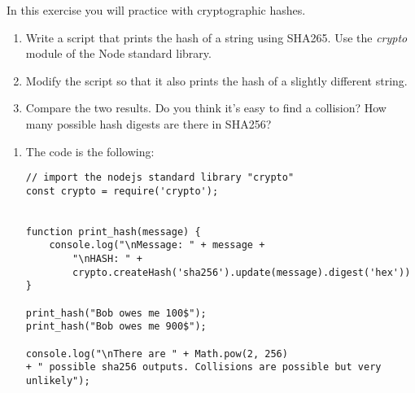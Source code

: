
\begin{Exercise}[label={basic-js-crypto-sha256}]
In this exercise you will practice with cryptographic hashes.

\begin{enumerate}[1.]
\item Write a script that prints the hash of a string using SHA265. 
Use the \textit{crypto} module of the Node standard library.
\item Modify the script so that it also prints 
the hash of a slightly different string. 
\item Compare the two results. 
Do you think it's easy to find a collision? 
How many possible hash digests are there in SHA256?
	
\end{enumerate}
\end{Exercise}

\begin{Answer}[ref={basic-js-crypto-sha256}]
\begin{enumerate}[1.]
\item The code is the following: 

\begin{lstlisting}[style=JavaScript]
// import the nodejs standard library "crypto"
const crypto = require('crypto');


function print_hash(message) {
    console.log("\nMessage: " + message +
        "\nHASH: " + 
        crypto.createHash('sha256').update(message).digest('hex'))
}

print_hash("Bob owes me 100$");
print_hash("Bob owes me 900$");

console.log("\nThere are " + Math.pow(2, 256) 
+ " possible sha256 outputs. Collisions are possible but very unlikely");
\end{lstlisting}
\end{enumerate}
\end{Answer}



